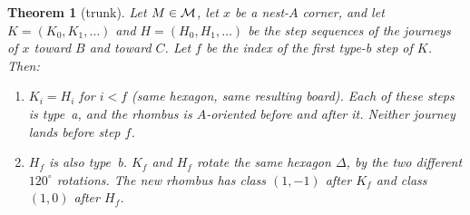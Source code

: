 \documentclass[11pt]{article}
\newtheorem{theorem}{Theorem}\newtheorem{lemma}[theorem]{Lemma}\newtheorem{proposition}[theorem]{Proposition}
\theoremstyle{definition}\newtheorem{definition}[theorem]{Definition}\newtheorem{remark}[theorem]{Remark}
\begin{document}
\begin{theorem}[trunk]\label{thm:trunk}
Let $M\in\mathcal M$, let $x$ be a nest-$A$ corner, and let $K=(K_0,K_1,\dots)$ and $H=(H_0,H_1,\dots)$ be the step sequences of the journeys
of $x$ toward $B$ and toward $C$. Let $f$ be the index of the first type-b step of $K$. Then:
\begin{enumerate}
\item $K_i=H_i$ for $i<f$ (same hexagon, same resulting board). Each of these steps is type~a, and the rhombus is $A$-oriented before
and after it. Neither journey lands before step $f$.
\item $H_f$ is also type~b. $K_f$ and $H_f$ rotate the same hexagon $\Delta$, by the two different $120^\circ$ rotations. The new
rhombus has class $(1,-1)$ after $K_f$ and class $(1,0)$ after $H_f$.
\end{enumerate}
\end{theorem}
\end{document}
